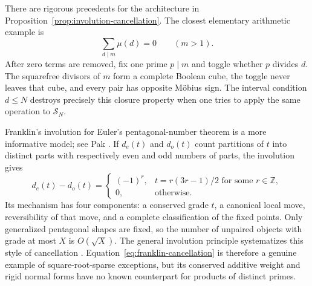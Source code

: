 \documentclass[11pt]{amsart}
\numberwithin{equation}{section}
\theoremstyle{plain}
\theoremstyle{definition}
\theoremstyle{remark}
\begin{document}
There are rigorous precedents for the architecture in
Proposition~\ref{prop:involution-cancellation}.  The closest elementary
arithmetic example is
\begin{equation}
  \sum_{d\mid m}\mu(d)=0
  \qquad (m>1).
  \label{eq:divisor-cube-cancellation}
\end{equation}
After zero terms are removed, fix one prime \(p\mid m\) and toggle whether
\(p\) divides \(d\).  The squarefree divisors of \(m\) form a complete Boolean
cube, the toggle never leaves that cube, and every pair has opposite M\"obius
sign.  The interval condition \(d\leq N\) destroys precisely this closure
property when one tries to apply the same operation to \(\mathcal S_N\).

Franklin's involution for Euler's pentagonal-number theorem is a more
informative model; see Pak \cite{Pak2004}.  If \(d_e(t)\) and \(d_o(t)\) count
partitions of \(t\) into distinct parts with respectively even and odd numbers
of parts, the involution gives
\begin{equation}
  d_e(t)-d_o(t)=
  \begin{cases}
    (-1)^r,&t=r(3r-1)/2\text{ for some }r\in\mathbb Z,\\
    0,&\text{otherwise}.
  \end{cases}
  \label{eq:franklin-cancellation}
\end{equation}
Its mechanism has four components: a conserved grade \(t\), a canonical local
move, reversibility of that move, and a complete classification of the fixed
points.  Only generalized pentagonal shapes are fixed, so the number of
unpaired objects with grade at most \(X\) is \(O(\sqrt X)\).  The general
involution principle systematizes this style of cancellation
\cite{GarsiaMilne1981}.  Equation~\eqref{eq:franklin-cancellation} is therefore
a genuine example of square-root-sparse exceptions, but its conserved additive
weight and rigid normal forms have no known counterpart for products of
distinct primes.
\end{document}
